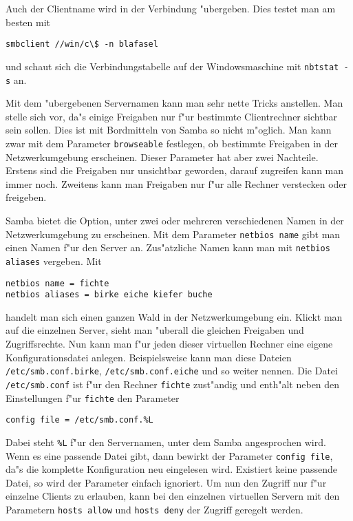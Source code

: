 \documentclass{scrartcl}\usepackage{pslatex}\typearea{12}
\newcommand{\param}{\texttt}
\newcommand{\dateistyle}{\texttt}
\newcommand{\nbname}{\texttt}
\begin{document}
Auch der Clientname wird in der Verbindung "ubergeben. Dies testet man
am besten mit

\verb|smbclient //win/c\$ -n blafasel| 

\noindent und schaut sich
die Verbindungstabelle auf der Windowsmaschine mit \verb|nbtstat -s|
an.

Mit dem "ubergebenen Servernamen kann man sehr nette Tricks anstellen.
Man stelle sich vor, da"s einige Freigaben nur f"ur bestimmte
Clientrechner sichtbar sein sollen. Dies ist mit Bordmitteln von Samba
so nicht m"oglich. Man kann zwar mit dem Parameter \param{browseable}
festlegen, ob bestimmte Freigaben in der Netzwerkumgebung erscheinen.
Dieser Parameter hat aber zwei Nachteile.  Erstens sind die Freigaben nur
unsichtbar geworden, darauf zugreifen kann man immer noch. Zweitens kann man
Freigaben nur f"ur alle Rechner verstecken oder freigeben.

Samba bietet die Option, unter zwei oder mehreren verschiedenen Namen
in der Netzwerkumgebung zu erscheinen. Mit dem Parameter
\param{netbios name} gibt man einen Namen f"ur den Server an.
Zus"atzliche Namen kann man mit \param{netbios aliases} vergeben. Mit

\begin{verbatim}
netbios name = fichte
netbios aliases = birke eiche kiefer buche
\end{verbatim}

\noindent
handelt man sich einen ganzen Wald in der Netzwerkumgebung ein. Klickt
man auf die einzelnen Server, sieht man "uberall die gleichen
Freigaben und Zugriffsrechte. Nun kann man f"ur jeden dieser
virtuellen Rechner eine eigene Konfigurationsdatei anlegen.
Beispielsweise kann man diese Dateien \dateistyle{/etc/smb.conf.birke},
\dateistyle{/etc/smb.conf.eiche} und so weiter nennen. Die Datei
\dateistyle{/etc/smb.conf} ist f"ur den Rechner \nbname{fichte} zust"andig
und enth"alt neben den Einstellungen f"ur \nbname{fichte} den
Parameter 

\param{config file = /etc/smb.conf.\%L}

\noindent Dabei steht
\param{\%L} f"ur den Servernamen, unter dem Samba angesprochen wird.
Wenn es eine passende Datei gibt, dann bewirkt der Parameter
\param{config file}, da"s die komplette Konfiguration neu eingelesen
wird. Existiert keine passende Datei, so wird der Parameter einfach
ignoriert. Um nun den Zugriff nur f"ur einzelne Clients zu erlauben,
kann bei den einzelnen virtuellen Servern mit den Parametern
\param{hosts allow} und \param{hosts deny} der Zugriff geregelt
werden.
\end{document}
